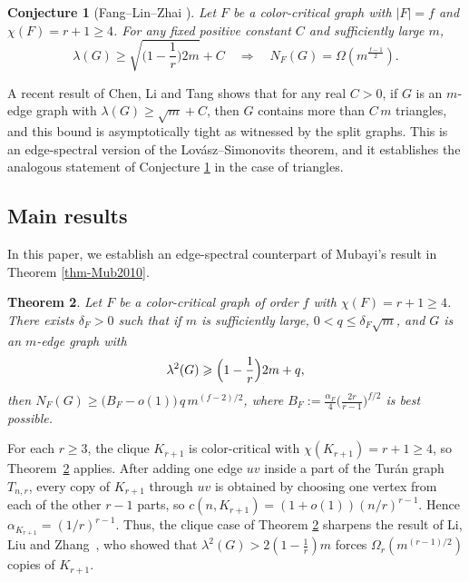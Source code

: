 \documentclass[11pt,a4paper]{article}
\newtheorem{theorem}{Theorem}[section]
\newtheorem{conjecture}[theorem]{Conjecture}
\theoremstyle{definition}
\theoremstyle{plain}
\renewcommand{\le}{\leqslant}
\renewcommand{\geq}{\geqslant}
\renewcommand{\ge}{\geqslant}
\begin{document}
\begin{conjecture}[Fang--Lin--Zhai \cite{FLZ}] 
\label{conj-FLZ}
Let $ F $ be a color-critical graph with $ |F| = f $
 and $ \chi(F) = r + 1 \geq 4 $. For any fixed positive constant $ C $ and sufficiently large $ m $, 
$$ \lambda(G) \geq \sqrt{\Big(1 - \frac{1}{r}\Big)2m} +C \quad \Rightarrow \quad 
N_F(G) = \Omega\! \left(m^{\!\frac{f-1}{2}}\right). $$   
\end{conjecture}

A recent result of Chen, Li and Tang \cite{CLT2026} shows that for any real $C>0$, if $G$ is an $m$-edge graph with $\lambda (G)\ge \sqrt{m} +C$, then $G$ contains more than $C\, m$ triangles, and this bound is asymptotically tight 
as witnessed by the split graphs. 
This is an edge-spectral version of the Lov\'{a}sz--Simonovits theorem, and it establishes the analogous statement of Conjecture \ref{conj-FLZ} in the case of triangles. 

\subsection{Main results}

In this paper, we establish an 
edge-spectral counterpart of Mubayi's result in Theorem \ref{thm-Mub2010}. 

\begin{theorem} \label{thm:squared-gap}
Let $F$ be a color-critical graph of order $f$ with $\chi (F)=r+1\ge 4$. There exists $\delta_F>0$ such that if $m$ is sufficiently large, 
$0<q\le \delta_F \sqrt m$, and $G$ is an 
$m$-edge graph with 
\[
  \lambda^2(G) \ge \Bigl(1-\frac1r\Bigr) 2m+q, 
\]
then  $  N_F (G)\ge
  \big(B_{F}- o(1) \big)\,q\,m^{(f-2)/2}$, 
where $B_{F}:=\frac{\alpha_F}{4}\bigl(\frac{2r}{r-1}\bigr)^{f/2}$
is best possible. 
\end{theorem}


For each $r\ge 3$, 
the clique $K_{r+1}$ is color-critical with $\chi(K_{r+1})=r+1\ge4$,
so Theorem~\ref{thm:squared-gap} applies.  
After adding one edge $uv$ inside a part of the Tur\'{a}n graph $T_{n,r}$, every copy of $K_{r+1}$ through $uv$ is obtained by choosing one
vertex from each of the other $r-1$ parts, so 
$c(n,K_{r+1}) =(1+o(1))(n/r)^{r-1}$. Hence $\alpha_{K_{r+1}}=(1/r)^{r-1}$. 
Thus, the clique case of Theorem \ref{thm:squared-gap} sharpens the result of Li, Liu and Zhang~\cite{LiLiuZhang26},
who showed that $\lambda^2(G)>2(1-\tfrac1r)m$ forces $\Omega_r(m^{(r-1)/2})$ copies of
$K_{r+1}$.  
\end{document}
